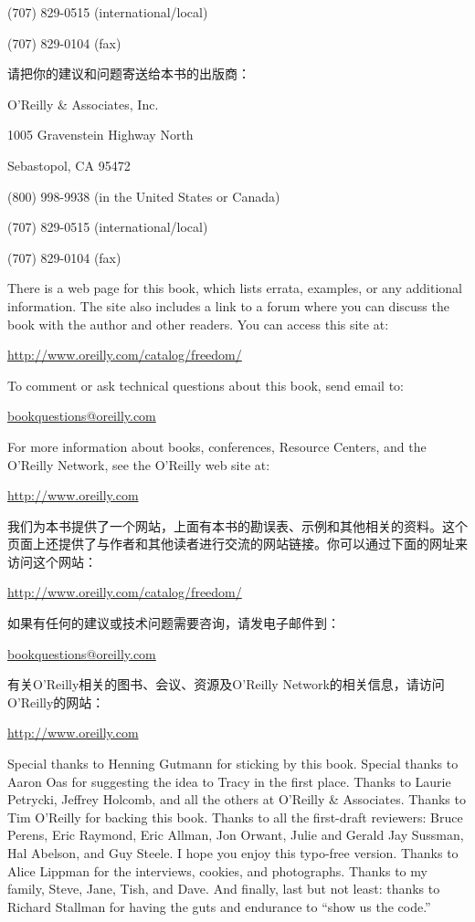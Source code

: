 (707) 829-0515 (international/local) 

(707) 829-0104 (fax)
\fi

\ifdefined\chs
请把你的建议和问题寄送给本书的出版商：

O'Reilly \& Associates, Inc. 

1005 Gravenstein Highway North 

Sebastopol, CA 95472 

(800) 998-9938 (in the United States or Canada) 

(707) 829-0515 (international/local) 

(707) 829-0104 (fax)
\fi

\ifdefined\eng
There is a web page for this book, which lists errata, examples, or any additional information. The site also includes a link to a forum where you can discuss the book with the author and other readers. You can access this site at:

\url{http://www.oreilly.com/catalog/freedom/}

To comment or ask technical questions about this book, send email to:

\url{bookquestions@oreilly.com}

For more information about books, conferences, Resource Centers, and the O'Reilly Network, see the O'Reilly web site at:

\url{http://www.oreilly.com}
\fi

\ifdefined\chs
我们为本书提供了一个网站，上面有本书的勘误表、示例和其他相关的资料。这个页面上还提供了与作者和其他读者进行交流的网站链接。你可以通过下面的网址来访问这个网站：

\url{http://www.oreilly.com/catalog/freedom/}

如果有任何的建议或技术问题需要咨询，请发电子邮件到：

\url{bookquestions@oreilly.com}

有关O’Reilly相关的图书、会议、资源及O’Reilly Network的相关信息，请访问O’Reilly的网站：

\url{http://www.oreilly.com}
\fi

\bigskip 

\ifdefined\eng
{}
\fi

\ifdefined\chs
{}
\fi

\bigskip 

\ifdefined\eng
Special thanks to Henning Gutmann for sticking by this book. Special thanks to Aaron Oas for suggesting the idea to Tracy in the first place. Thanks to Laurie Petrycki, Jeffrey Holcomb, and all the others at O'Reilly \& Associates. Thanks to Tim O'Reilly for backing this book. Thanks to all the first-draft reviewers: Bruce Perens, Eric Raymond, Eric Allman, Jon Orwant, Julie and Gerald Jay Sussman, Hal Abelson, and Guy Steele. I hope you enjoy this typo-free version. Thanks to Alice Lippman for the interviews, cookies, and photographs. Thanks to my family, Steve, Jane, Tish, and Dave. And finally, last but not least: thanks to Richard Stallman for having the guts and endurance to ``show us the code.''
\fi

